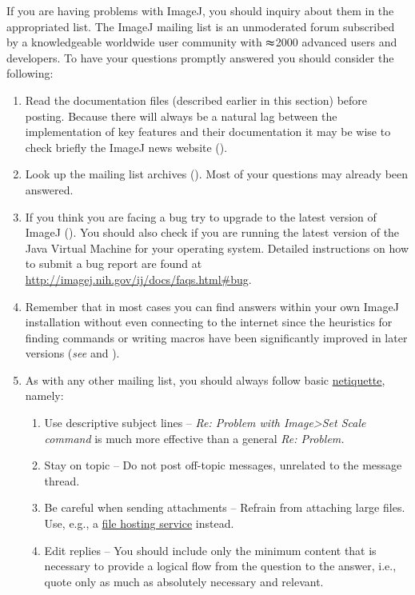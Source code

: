 If you are having problems with ImageJ, you should inquiry about them
in the appropriated list. The ImageJ mailing
list is an unmoderated forum subscribed by a knowledgeable worldwide
user community with $\thickapprox$2000 advanced users and developers.
To have your questions promptly answered you should consider the following:
\begin{enumerate}
\item Read the documentation files (described earlier in this section) before
posting. Because there will always be a natural lag between the implementation
of key features and their documentation it may be wise to check briefly
the ImageJ news website (\textsf{}).
\item Look up the mailing list archives (\textsf{}).
Most of your questions may already been answered.
\item If you think you are facing a bug
try to upgrade to the latest version of ImageJ (\textsf{}).
You should also check if you are running the latest version of the
Java Virtual Machine for your operating system. Detailed instructions
on how to submit a bug report are found at \url{http://imagej.nih.gov/ij/docs/faqs.html#bug}.
\item Remember that in most cases you can find answers within your own ImageJ
installation without even connecting to the internet since the heuristics
for finding commands or writing macros have been significantly improved
in later versions (\emph{see}  and
).
\item As with any other mailing list, you should always follow basic \href{http://en.wikipedia.org/wiki/Netiquette}{netiquette},
namely:

\begin{enumerate}
\item Use descriptive subject lines -- \emph{Re: Problem with Image>Set
Scale command }is much more effective than a general\emph{ Re: Problem.}
\item Stay on topic -- Do not post off-topic messages, unrelated to the
message thread.
\item Be careful when sending attachments -- Refrain from attaching large
files. Use, e.g., a \href{http://en.wikipedia.org/wiki/File_hosting_service\#Comparison_of_notable_file_hosting_services}{file hosting service}
instead.
\item Edit replies -- You should include only the minimum content that is
necessary to provide a logical flow from the question to the answer,
i.e., quote only as much as absolutely necessary and relevant.\end{enumerate}
\end{enumerate}

